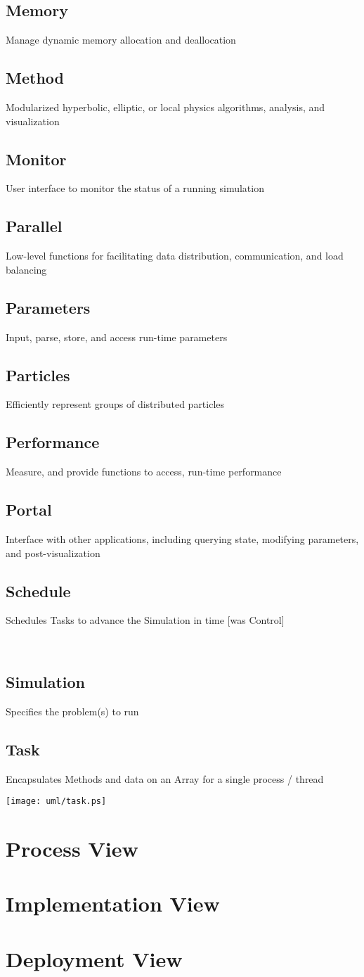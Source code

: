 \documentclass{book}
\begin{document}
\section{Memory}
 	Manage dynamic memory allocation and deallocation
\section{Method}
 	Modularized hyperbolic, elliptic, or local physics algorithms, analysis, and visualization
\section{Monitor}
 	User interface to monitor the status of a running simulation
\section{Parallel}
 	Low-level functions for facilitating data distribution, communication, and load balancing
\section{Parameters}
 	Input, parse, store, and access run-time parameters
\section{Particles}
 	Efficiently represent groups of distributed particles
\section{Performance}
 	Measure, and provide functions to access, run-time performance
\section{Portal}
 	Interface with other applications, including querying state, modifying parameters, and post-visualization
\section{Schedule}
 	Schedules Tasks to advance the Simulation in time [was Control]

\
\section{Simulation}
 	Specifies the problem(s) to run
\section{Task}
 	Encapsulates Methods and data on an Array for a single process / thread 

\centerline{\texttt{[image: uml/task.ps]}}

\chapter{Process View}
\chapter{Implementation View}
\chapter{Deployment View}
\end{document}
